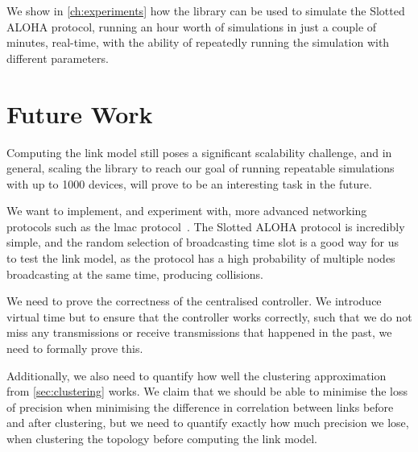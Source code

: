 


We show in \autoref{ch:experiments} how the library can be used to simulate the Slotted ALOHA protocol, running an hour worth of simulations in just a couple of minutes, real-time, with the ability of repeatedly running the simulation with different parameters.


\section{Future Work}\label{sec:futurework}
Computing the link model still poses a significant scalability challenge, and in general, scaling the library to reach our goal of running repeatable simulations with up to 1000 devices, will prove to be an interesting task in the future.\smallbreak

We want to implement, and experiment with, more advanced networking protocols such as the \gls{lmac} protocol~\cite{paper:lmac_protocol}. The Slotted ALOHA protocol is incredibly simple, and the random selection of broadcasting time slot is a good way for us to test the link model, as the protocol has a high probability of multiple nodes broadcasting at the same time, producing collisions.\smallbreak

We need to prove the correctness of the centralised controller. We introduce virtual time but to ensure that the controller works correctly, such that we do not miss any transmissions or receive transmissions that happened in the past, we need to formally prove this.\smallbreak

Additionally, we also need to quantify how well the clustering approximation from \autoref{sec:clustering} works. We claim that we should be able to minimise the loss of precision when minimising the difference in correlation between links before and after clustering, but we need to quantify exactly how much precision we lose, when clustering the topology before computing the link model. \smallbreak


